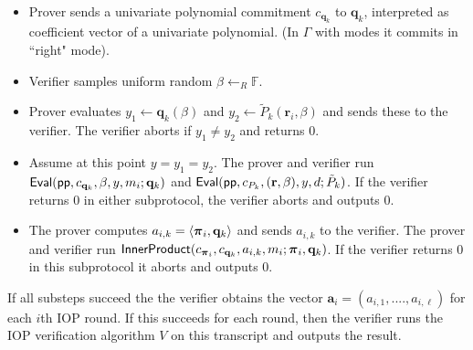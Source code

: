 \begin{itemize}
\begin{itemize}
 \item Prover sends a univariate polynomial commitment $c_{\mathbf{q}_k}$ to $\mathbf{q}_k$, interpreted as coefficient vector of a univariate polynomial. (In $\Gamma$ with modes it commits in ``right" mode). 
 \item Verifier samples uniform random $\beta \leftarrow_R\mathbb{F}$. 
 \item Prover evaluates $y_1 \leftarrow \mathbf{q}_k(\beta)$ and $y_2 \leftarrow \tilde{P}_k(\mathbf{r}_i, \beta)$ and sends these to the verifier. The verifier aborts if $y_1 \neq y_2$ and returns 0. 
 \item Assume at this point $y = y_1 = y_2$. The prover and verifier run $\textsf{{Eval}}(\textsf{pp}, c_{\mathbf{q}_k}, \beta, y, m_i; \mathbf{q}_k)$ and $\textsf{{Eval}}(\textsf{pp}, c_{P_k}, (\mathbf{r}, \beta), y, d; \tilde{P}_k)$. If the verifier returns 0 in either subprotocol, the verifier aborts and outputs 0. 
 \item The prover computes $a_{i,k} = \langle \boldsymbol{\pi}_i, \mathbf{q}_k \rangle$ and sends $a_{i,k}$ to the verifier. The prover and verifier run $\textsf{{InnerProduct}}(c_{\boldsymbol{\pi}_i}, c_{\mathbf{q}_k}, a_{i,k}, m_i; \boldsymbol{\pi}_i, \mathbf{q}_k)$. If the verifier returns 0 in this subprotocol it aborts and outputs 0.
 \end{itemize} 
 
If all substeps succeed the the verifier obtains the vector $\mathbf{a}_i = (a_{i,1},....,a_{i, \ell})$ for each $i$th IOP round. If this succeeds for each round, then the verifier runs the IOP verification algorithm $V$ on this transcript and outputs the result.

\end{itemize}






